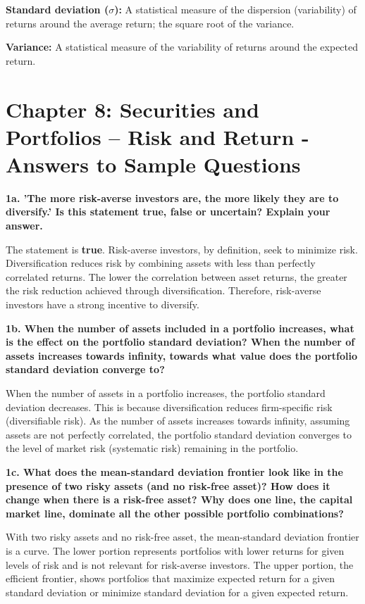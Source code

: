 \documentclass[twoside,openany]{book}
\begin{document}
\textbf{Standard deviation ($\sigma$): } A statistical measure of the dispersion (variability) of returns around the average return; the square root of the variance.

\textbf{Variance:} A statistical measure of the variability of returns around the expected return.

\section*{Chapter 8: Securities and Portfolios – Risk and Return - Answers to Sample Questions}

\textbf{1a. 'The more risk-averse investors are, the more likely they are to diversify.' Is this statement true, false or uncertain? Explain your answer.}

The statement is \textbf{true}. Risk-averse investors, by definition, seek to minimize risk. Diversification reduces risk by combining assets with less than perfectly correlated returns. The lower the correlation between asset returns, the greater the risk reduction achieved through diversification. Therefore, risk-averse investors have a strong incentive to diversify.

\textbf{1b. When the number of assets included in a portfolio increases, what is the effect on the portfolio standard deviation? When the number of assets increases towards infinity, towards what value does the portfolio standard deviation converge to?}

When the number of assets in a portfolio increases, the portfolio standard deviation decreases. This is because diversification reduces firm-specific risk (diversifiable risk). As the number of assets increases towards infinity, assuming assets are not perfectly correlated, the portfolio standard deviation converges to the level of market risk (systematic risk) remaining in the portfolio.

\textbf{1c. What does the mean-standard deviation frontier look like in the presence of two risky assets (and no risk-free asset)? How does it change when there is a risk-free asset? Why does one line, the capital market line, dominate all the other possible portfolio combinations?}

With two risky assets and no risk-free asset, the mean-standard deviation frontier is a curve. The lower portion represents portfolios with lower returns for given levels of risk and is not relevant for risk-averse investors. The upper portion, the efficient frontier, shows portfolios that maximize expected return for a given standard deviation or minimize standard deviation for a given expected return.
\end{document}
